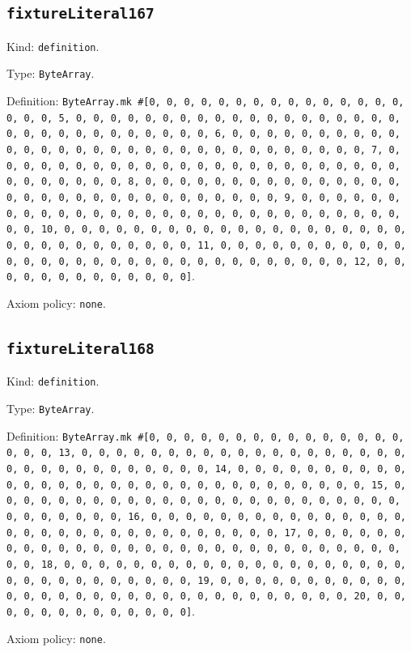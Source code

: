 \documentclass[11pt]{article}
\begin{document}
\subsection*{\texttt{fixtureLiteral167}}
\noindent Kind: \texttt{definition}.\par
\noindent Type: \texttt{ByteArray}.\par
\noindent Definition: \texttt{ByteArray.mk \#[0, 0, 0, 0, 0, 0, 0, 0, 0, 0, 0, 0, 0, 0, 0, 0, 0, 0, 5, 0, 0, 0, 0, 0, 0, 0, 0, 0, 0, 0, 0, 0, 0, 0, 0, 0, 0, 0, 0, 0, 0, 0, 0, 0, 0, 0, 0, 0, 0, 0, 6, 0, 0, 0, 0, 0, 0, 0, 0, 0, 0, 0, 0, 0, 0, 0, 0, 0, 0, 0, 0, 0, 0, 0, 0, 0, 0, 0, 0, 0, 0, 0, 7, 0, 0, 0, 0, 0, 0, 0, 0, 0, 0, 0, 0, 0, 0, 0, 0, 0, 0, 0, 0, 0, 0, 0, 0, 0, 0, 0, 0, 0, 0, 0, 8, 0, 0, 0, 0, 0, 0, 0, 0, 0, 0, 0, 0, 0, 0, 0, 0, 0, 0, 0, 0, 0, 0, 0, 0, 0, 0, 0, 0, 0, 0, 0, 9, 0, 0, 0, 0, 0, 0, 0, 0, 0, 0, 0, 0, 0, 0, 0, 0, 0, 0, 0, 0, 0, 0, 0, 0, 0, 0, 0, 0, 0, 0, 0, 10, 0, 0, 0, 0, 0, 0, 0, 0, 0, 0, 0, 0, 0, 0, 0, 0, 0, 0, 0, 0, 0, 0, 0, 0, 0, 0, 0, 0, 0, 0, 0, 11, 0, 0, 0, 0, 0, 0, 0, 0, 0, 0, 0, 0, 0, 0, 0, 0, 0, 0, 0, 0, 0, 0, 0, 0, 0, 0, 0, 0, 0, 0, 0, 12, 0, 0, 0, 0, 0, 0, 0, 0, 0, 0, 0, 0, 0]}.\par
\noindent Axiom policy: \texttt{none}.\par
\subsection*{\texttt{fixtureLiteral168}}
\noindent Kind: \texttt{definition}.\par
\noindent Type: \texttt{ByteArray}.\par
\noindent Definition: \texttt{ByteArray.mk \#[0, 0, 0, 0, 0, 0, 0, 0, 0, 0, 0, 0, 0, 0, 0, 0, 0, 0, 13, 0, 0, 0, 0, 0, 0, 0, 0, 0, 0, 0, 0, 0, 0, 0, 0, 0, 0, 0, 0, 0, 0, 0, 0, 0, 0, 0, 0, 0, 0, 0, 14, 0, 0, 0, 0, 0, 0, 0, 0, 0, 0, 0, 0, 0, 0, 0, 0, 0, 0, 0, 0, 0, 0, 0, 0, 0, 0, 0, 0, 0, 0, 0, 15, 0, 0, 0, 0, 0, 0, 0, 0, 0, 0, 0, 0, 0, 0, 0, 0, 0, 0, 0, 0, 0, 0, 0, 0, 0, 0, 0, 0, 0, 0, 0, 16, 0, 0, 0, 0, 0, 0, 0, 0, 0, 0, 0, 0, 0, 0, 0, 0, 0, 0, 0, 0, 0, 0, 0, 0, 0, 0, 0, 0, 0, 0, 0, 17, 0, 0, 0, 0, 0, 0, 0, 0, 0, 0, 0, 0, 0, 0, 0, 0, 0, 0, 0, 0, 0, 0, 0, 0, 0, 0, 0, 0, 0, 0, 0, 18, 0, 0, 0, 0, 0, 0, 0, 0, 0, 0, 0, 0, 0, 0, 0, 0, 0, 0, 0, 0, 0, 0, 0, 0, 0, 0, 0, 0, 0, 0, 0, 19, 0, 0, 0, 0, 0, 0, 0, 0, 0, 0, 0, 0, 0, 0, 0, 0, 0, 0, 0, 0, 0, 0, 0, 0, 0, 0, 0, 0, 0, 0, 0, 20, 0, 0, 0, 0, 0, 0, 0, 0, 0, 0, 0, 0, 0]}.\par
\noindent Axiom policy: \texttt{none}.\par
\end{document}

